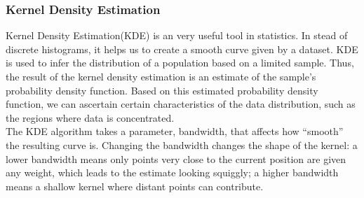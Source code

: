\documentclass{article}\usepackage[]{graphicx}\usepackage[]{xcolor}
\begin{document}
\subsubsection{Kernel Density Estimation}

Kernel Density Estimation(KDE) is an very useful tool in statistics. In stead of discrete histograms, it helps us to create a smooth curve given by a dataset. KDE is used to infer the distribution of a population based on a limited sample. Thus, the result of the kernel density estimation is an estimate of the sample's probability density function. Based on this estimated probability density function, we can ascertain certain characteristics of the data distribution, such as the regions where data is concentrated.\\

\noindent
The KDE algorithm takes a parameter, bandwidth, that affects how “smooth” the resulting curve is. Changing the bandwidth changes the shape of the kernel: a lower bandwidth means only points very close to the current position are given any weight, which leads to the estimate looking squiggly; a higher bandwidth means a shallow kernel where distant points can contribute.\\
\end{document}
